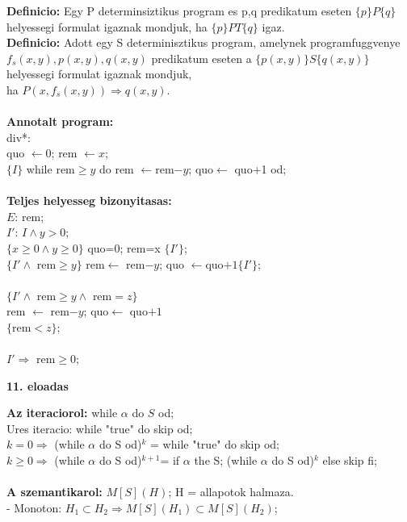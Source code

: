 \documentclass[a4paper,10pt]{article}
\begin{document}
\textbf{Definicio:} Egy P determinsiztikus program es p,q predikatum eseten $\lbrace p\rbrace P\lbrace q\rbrace$ helyessegi formulat igaznak mondjuk, ha $\lbrace p\rbrace PT\lbrace q\rbrace$ igaz.\\
\textbf{Definicio:} Adott egy S determinisztikus program, amelynek programfuggvenye $f_s(x,y),p(x,y),q(x,y)$ predikatum eseten a $\lbrace p(x,y)\rbrace S\lbrace q(x,y)\rbrace$ helyessegi formulat igaznak mondjuk,\\
ha $P(x, f_s(x,y)) \Rightarrow q(x,y)$.\\
\\
\textbf{Annotalt program:}\\
div*:\\
quo $\leftarrow 0$; rem $\leftarrow x$;\\
$\lbrace I\rbrace$ while rem$\ge y$ do rem $\leftarrow $rem$-y$; quo$\leftarrow$ quo+1 od;\\\\
\textbf{Teljes helyesseg bizonyitasas:}\\
$E$: rem;\\
$I'$: $I \wedge y >0$;\\
$\lbrace x\ge 0 \wedge y\ge 0\rbrace$ quo=0; rem=x $\lbrace I'\rbrace$;\\
$\lbrace I'\wedge$ rem$\ge y\rbrace$ rem$\leftarrow$ rem$-y$; quo $\leftarrow $quo$+1\lbrace I'\rbrace$;\\\\
$\lbrace I'\wedge$ rem$\ge y\wedge$ rem$=z\rbrace$\\
rem $\leftarrow$ rem$-y$; quo$\leftarrow$ quo$+1$\\
$\lbrace$rem$<z\rbrace$;\\\\
$I' \Rightarrow$ rem$\ge0$;\newpage
%
%
\begin{flushleft}
\textbf{11. eloadas}
\end{flushleft}
\textbf{Az iteraciorol:} while $\alpha$ do $S$ od;\\
Ures iteracio: while "true" do skip od;\\
$k=0 \Rightarrow$ (while $\alpha$ do S od)$^k$ = while "true" do skip od;\\
$k\ge0 \Rightarrow$ (while $\alpha$ do S od)$^{k+1}$= if $\alpha$ the S; (while $\alpha$ do S od)$^k$ else skip fi;\\
\\
\textbf{A szemantikarol:} $M[S](H)$; H = allapotok halmaza.\\
- Monoton: $H_1 \subset H_2 \Rightarrow M[S](H_1) \subset M[S](H_2)$;\\
\end{document}
